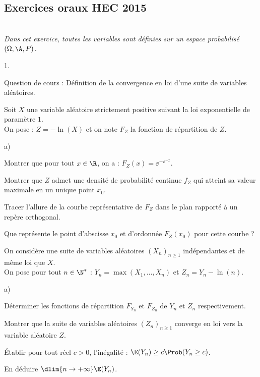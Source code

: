 \subsection*{Exercices oraux HEC 2015}


\begin{exerciceAP}~\\
  {\it Dans cet exercice, toutes les variables sont définies sur un
    espace probabilisé $(\Omega,\A,P)$.}
  \begin{noliste}{1.}
    \setlength{\itemsep}{2mm}
  \item Question de cours : Définition de la convergence en loi d'une
    suite de variables aléatoires.
  \item Soit $X$ une variable aléatoire strictement positive suivant
    la loi exponentielle de paramètre $1$.\\
    On pose : $Z=-\ln(X)$ et on note $F_Z$ la fonction de répartition
    de $Z$.
    \begin{noliste}{a)}
    \setlength{\itemsep}{2mm}
    \item Montrer que pour tout $x\in\R$, on a :
      $F_Z(x)=\ee^{-\ee^{-x}}$.
    \item Montrer que $Z$ admet une densité de probabilité continue
      $f_Z$ qui atteint sa valeur maximale en un unique point $x_0$.
    \item Tracer l'allure de la courbe représentative de $F_Z$ dans le
      plan rapporté à un repère orthogonal.
    \item Que représente le point d'abscisse $x_0$ et d'ordonnée
      $F_Z(x_0)$ pour cette courbe ?
    \end{noliste}
  \item On considère une suite de variables aléatoires $(X_n)_{n\geq
      1}$ indépendantes et de même loi que $X$.\\
    On pose pour tout $n\in\N^*$ : $Y_n=\max(X_1,\hdots,X_n)$ et
    $Z_n=Y_n-\ln(n)$.
    \begin{noliste}{a)}
    \setlength{\itemsep}{2mm}
    \item Déterminer les fonctions de répartition $F_{Y_n}$ et
      $F_{Z_n}$ de $Y_n$ et $Z_n$ respectivement.
    \item Montrer que la suite de variables aléatoires $(Z_n)_{n\geq
        1}$ converge en loi vers la variable aléatoire $Z$.
    \item Établir pour tout réel $c>0$, l'inégalité : $\E(Y_n)\geq
      c\Prob(Y_n\geq c)$.
    \item En déduire $\dlim{n\to+\infty} \E(Y_n)$.
    \end{noliste}
  \end{noliste}
\end{exerciceAP} 


